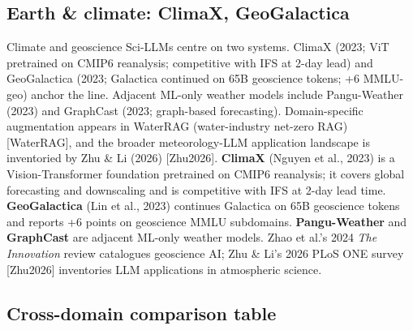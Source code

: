 \documentclass{article}
\begin{document}
\subsection{Earth \& climate: ClimaX, GeoGalactica}\label{earth-climate-climax-geogalactica}

Climate and geoscience Sci-LLMs centre on two systems. ClimaX (2023; ViT pretrained on CMIP6 reanalysis; competitive with IFS at 2-day lead) \cite{nguyen2023arxiv2301103432023} and GeoGalactica (2023; Galactica continued on 65B geoscience tokens; +6 MMLU-geo) \cite{lin2023geogalacticaascien} anchor the line. Adjacent ML-only weather models include Pangu-Weather (2023) and GraphCast (2023; graph-based forecasting). Domain-specific augmentation appears in WaterRAG (water-industry net-zero RAG) {[}WaterRAG{]}, and the broader meteorology-LLM application landscape is inventoried by Zhu \& Li (2026) {[}Zhu2026{]}. \textbf{ClimaX} (Nguyen et al., 2023) \cite{nguyen2023arxiv2301103432023} is a Vision-Transformer foundation pretrained on CMIP6 reanalysis; it covers global forecasting and downscaling and is competitive with IFS at 2-day lead time. \textbf{GeoGalactica} (Lin et al., 2023) \cite{lin2023geogalacticaascien} continues Galactica on 65B geoscience tokens and reports +6 points on geoscience MMLU subdomains. \textbf{Pangu-Weather} and \textbf{GraphCast} are adjacent ML-only weather models. Zhao et al.'s 2024 \emph{The Innovation} review \cite{zhao2024artificialintellig} catalogues geoscience AI; Zhu \& Li's 2026 PLoS ONE survey {[}Zhu2026{]} inventories LLM applications in atmospheric science.

\subsection{Cross-domain comparison table}\label{cross-domain-comparison-table}
\end{document}
